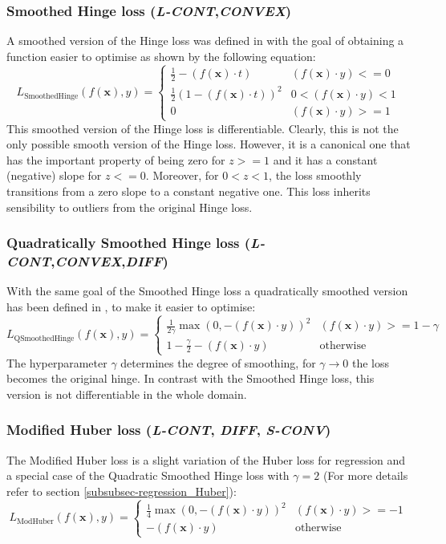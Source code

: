 \documentclass[sn-mathphys-num]{sn-jnl}%
\newcommand \lcont{\textit{L-CONT}}
\newcommand \sconv{\textit{S-CONV}}
\newcommand \diff{\textit{DIFF}}
\newcommand \conv{\textit{CONVEX}}
\renewcommand\vec{\mathbf}
\begin{document}
\subsubsection{Smoothed Hinge loss (\lcont,\conv)}
A smoothed version of the Hinge loss was defined in \cite{Rennie2013SmoothHC} with the goal of obtaining a function easier to optimise as shown by the following equation:
\begin{equation}
    L_{\text{SmoothedHinge}}(f(\vec{x}), y) = \begin{cases}
\frac{1}{2} - (f(\vec{x}) \cdot t) &(f(\vec{x}) \cdot y)<=0\\
\frac{1}{2}(1-(f(\vec{x}) \cdot t))^2 &0<(f(\vec{x}) \cdot y)<1\\
0 &(f(\vec{x}) \cdot y)>=1
\end{cases}
\end{equation}
This smoothed version of the Hinge loss is differentiable.
Clearly, this is not the only possible smooth version of the Hinge loss.
However, it is a canonical one that has the important property of being zero for $z >= 1$ and it has a constant (negative) slope
for $z <= 0$. Moreover, for $0 < z < 1$, the loss smoothly transitions from a zero slope to a constant negative one.
This loss inherits sensibility to outliers from the original Hinge loss.
\subsubsection{Quadratically Smoothed Hinge loss (\lcont,\conv,\diff)}
With the same goal of the Smoothed Hinge loss a quadratically smoothed version has been defined in \cite{Zhang04solvinglarge}, to make it easier to optimise:
\begin{equation}
    L_{\text{QSmoothedHinge}}(f(\vec{x}), y) = \begin{cases}
\frac{1}{2\gamma}\max(0, − (f(\vec{x}) \cdot y))^2 &(f(\vec{x}) \cdot y)>= 1 - \gamma\\
1 - \frac{\gamma}{2} - (f(\vec{x}) \cdot y) & \text{otherwise}
\end{cases}
\end{equation}
The hyperparameter $\gamma$ determines the degree of smoothing, for $\gamma \rightarrow 0$ the loss becomes the original hinge. In contrast with the Smoothed Hinge loss, this version is not differentiable in the whole domain.
\subsubsection{Modified Huber loss (\lcont, \diff, \sconv)}
The Modified Huber loss is a slight variation of the Huber loss for regression and a special case of the Quadratic Smoothed Hinge loss with $\gamma=2$ (For more details refer to section \ref{subsubsec-regression_Huber}):
\begin{equation}
    L_{\text{ModHuber}}(f(\vec{x}), y) = \begin{cases}
\frac{1}{4}\max(0, − (f(\vec{x}) \cdot y))^2 &(f(\vec{x}) \cdot y)>= -1\\
 - (f(\vec{x}) \cdot y) & \text{otherwise}
\end{cases}
\end{equation}
\\
\end{document}
